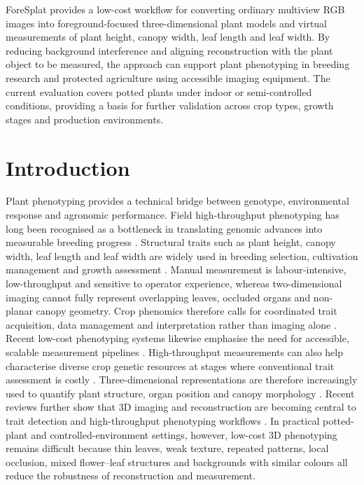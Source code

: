 \documentclass[a4paper]{cas-sc}
\begin{document}
ForeSplat provides a low-cost workflow for converting ordinary
multiview RGB images into foreground-focused three-dimensional
plant models and virtual measurements of plant height, canopy
width, leaf length and leaf width. By reducing background
interference and aligning reconstruction with the plant object
to be measured, the approach can support plant phenotyping
in breeding research and protected agriculture using accessible
imaging equipment. The current evaluation covers potted plants
under indoor or semi-controlled conditions, providing a basis
for further validation across crop types, growth stages and
production environments.

\section{Introduction}\label{sec:introduction}

Plant phenotyping provides a technical bridge between genotype, environmental response and agronomic performance. Field high-throughput phenotyping has long been recognised as a bottleneck in translating genomic advances into measurable breeding progress \cite{ref1,ref2}. Structural traits such as plant height, canopy width, leaf length and leaf width are widely used in breeding selection, cultivation management and growth assessment \cite{ref6,ref56,ref61}. Manual measurement is labour-intensive, low-throughput and sensitive to operator experience, whereas two-dimensional imaging cannot fully represent overlapping leaves, occluded organs and non-planar canopy geometry. Crop phenomics therefore calls for coordinated trait acquisition, data management and interpretation rather than imaging alone \cite{ref3}. Recent low-cost phenotyping systems likewise emphasise the need for accessible, scalable measurement pipelines \cite{ref62,ref63}. High-throughput measurements can also help characterise diverse crop genetic resources at stages where conventional trait assessment is costly \cite{ref5}. Three-dimensional representations are therefore increasingly used to quantify plant structure, organ position and canopy morphology \cite{ref8,ref10}. Recent reviews further show that 3D imaging and reconstruction are becoming central to trait detection and high-throughput phenotyping workflows \cite{ref9,ref11,ref12}. In practical potted-plant and controlled-environment settings, however, low-cost 3D phenotyping remains difficult because thin leaves, weak texture, repeated patterns, local occlusion, mixed flower--leaf structures and backgrounds with similar colours all reduce the robustness of reconstruction and measurement.
\end{document}
